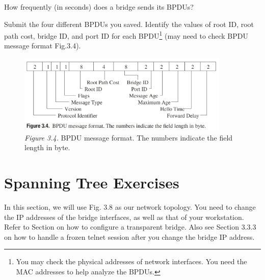 \documentclass{../UTNetLab}
\begin{document}
    \begin{report}
    \item How frequently (in seconds) does a bridge sends its BPDUs?

    \item Submit the four different BPDUs you saved.
    Identify the values of root ID, root path cost, bridge ID, and port ID for each BPDU\footnote{You may check the physical addresses of network interfaces. You need the MAC addresses to help analyze the BPDUs.} (may need to check BPDU message format Fig.3.4).
    \end{report}

    \begin{figure}[H]
        \centering
        \includegraphics[width=0.9\textwidth]{img/figure3-4.jpg}
        \caption{\textit{Figure 3.4.} BPDU message format. The numbers indicate the field length in byte.}
    \end{figure}

\part{Spanning Tree Exercises}
\label{sec:spanning-tree}
    In this section, we will use Fig. 3.8 as our network topology.
    You need to change the IP addresses of the bridge interfaces, as well as that of your workstation. Refer to Section      on how to configure a transparent bridge.
    Also see Section 3.3.3 on how to handle a frozen telnet session after you change the bridge IP address.
\end{document}
